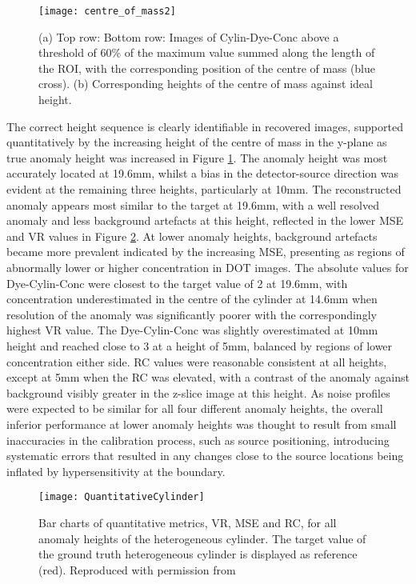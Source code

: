 \documentclass[twoside]{bhamthesis}
\theoremstyle{definition}
\begin{document}
\begin{figure}[!ht]
\centering
  \texttt{[image: centre\_of\_mass2]}
  \caption{(a) Top row: Bottom row: Images of Cylin-Dye-Conc above a threshold of 60\% of the maximum value summed along the length of the ROI, with the corresponding position of the centre of mass (blue cross). (b) Corresponding heights of the centre of mass against ideal height.}
    \label{fig:centre_of_mass2}
\end{figure}

The correct height sequence is clearly identifiable in recovered images, supported quantitatively by the increasing height of the centre of mass in the y-plane as true anomaly height was increased in Figure \ref{fig:centre_of_mass2}. The anomaly height was most accurately located at 19.6mm, whilst a bias in the detector-source direction was evident at the remaining three heights, particularly at 10mm. The reconstructed anomaly appears most similar to the target at 19.6mm, with a well resolved anomaly and less background artefacts at this height, reflected in the lower MSE and VR values in Figure \ref{fig:QuantitativeCylinder}. At lower anomaly heights, background artefacts became more prevalent indicated by the increasing MSE, presenting as regions of abnormally lower or higher concentration in DOT images. The absolute values for Dye-Cylin-Conc were closest to the target value of 2 at 19.6mm, with concentration underestimated in the centre of the cylinder at 14.6mm when resolution of the anomaly was significantly poorer with the correspondingly highest VR value. The Dye-Cylin-Conc was slightly overestimated at 10mm height and reached close to 3 at a height of 5mm, balanced by regions of lower concentration either side. RC values were reasonable consistent at all heights, except at 5mm when the RC was elevated, with a contrast of the anomaly against background visibly greater in the z-slice image at this height. As noise profiles were expected to be similar for all four different anomaly heights, the overall inferior performance at lower anomaly heights was thought to result from small inaccuracies in the calibration process, such as source positioning, introducing systematic errors that resulted in any changes close to the source locations being inflated by hypersensitivity at the boundary.

\begin{figure}[!ht]
\centering
  \texttt{[image: QuantitativeCylinder]}
  \caption{Bar charts of quantitative metrics, VR, MSE and RC, for all anomaly heights of the heterogeneous cylinder. The target value of the ground truth heterogeneous cylinder is displayed as reference (red). Reproduced with permission from \cite{lu20181}}
    \label{fig:QuantitativeCylinder}
\end{figure}
\end{document}
